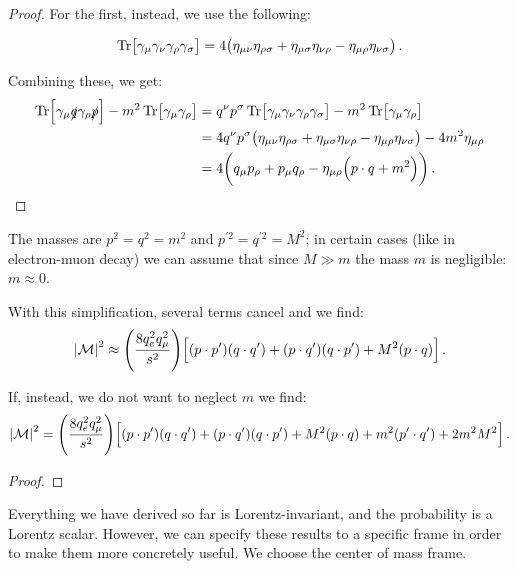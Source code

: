 \documentclass[main.tex]{subfiles}
\begin{document}
\begin{proof}
For the first, instead, we use the following:
\begin{claim}[Unproven]
\begin{align}
\Tr[\gamma_{\mu } \gamma_{\nu }\gamma_{\rho } \gamma_{\sigma }]
= 4 \qty(\eta_{\mu \nu } \eta_{\rho \sigma }
+ \eta_{\mu \sigma } \eta_{\nu \rho }
- \eta_{\mu \rho }\eta_{\nu \sigma })   
\,.
\end{align}
\end{claim}

Combining these, we get: 
%
\begin{align}
\Tr[ \gamma_{\mu } \slashed{q} \gamma_{\rho } \slashed{p}]
-m^2 \Tr[\gamma_{\mu } \gamma_{\rho }]
&= q^{\nu }p^{\sigma } \Tr[\gamma_{\mu } \gamma_{\nu }\gamma_{\rho } \gamma_{\sigma }]
- m^2 \Tr[\gamma_{\mu } \gamma_{\rho }]  \\
&= 4 q^{\nu }p^{\sigma } 
\qty(\eta_{\mu \nu } \eta_{\rho \sigma }
+ \eta_{\mu \sigma } \eta_{\nu \rho }
- \eta_{\mu \rho }\eta_{\nu \sigma })
- 4 m^2 \eta_{\mu \rho }  \\
&= 4 \qty(q_{\mu } p_{\rho } + p_{\mu }q_{\rho } - \eta_{\mu \rho } \qty( p \cdot q + m^2) )
\,.
\end{align}
\end{proof}

The masses are \(p^2 = q^2 = m^2\) and \(p^{\prime 2} = q^{\prime 2} = M^2\); in certain cases (like in electron-muon decay) we can assume that since \(M \gg m\) the mass \(m\) is negligible: \(m \approx 0\). 

With this simplification, several terms cancel and we find: 
%
\begin{align}
\abs{\mathcal{M}}^2 \approx \qty(\frac{8 q_e^2 q_{\mu}^2}{s^2})
\qty[(p \cdot p') (q \cdot q') + (p \cdot q')(q \cdot p') + M^2 (p \cdot q)]
\,.
\end{align}

\begin{claim}
If, instead, we do not want to neglect \(m\) we find: 
%
\begin{align}
\abs{\mathcal{M}}^2 = \qty(\frac{8 q_e^2 q_{\mu}^2}{s^2})
\qty[(p \cdot p') (q \cdot q') + (p \cdot q')(q \cdot p') + M^2 (p \cdot q) 
+ m^2 (p' \cdot q') + 2 m^2M^2]
\,.
\end{align}
\end{claim}

\begin{proof}
\end{proof}

Everything we have derived so far is Lorentz-invariant, and the probability is a Lorentz scalar. 
However, we can specify these results to a specific frame in order to make them more concretely useful. 
We choose the center of mass frame. 
\end{document}
